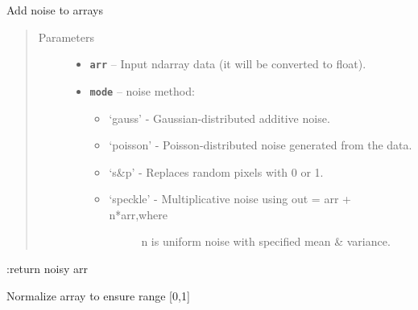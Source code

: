 \documentclass[letterpaper,10pt,english]{sphinxmanual}
\begin{document}
\begin{fulllineitems}
\label{RRtoolbox.lib.arrayops:RRtoolbox.lib.arrayops.basic.noisy}
Add noise to arrays
\begin{quote}\begin{description}
\item[{Parameters}] \leavevmode\begin{itemize}
\item {} 
\textbf{\texttt{arr}} -- Input ndarray data (it will be converted to float).

\item {} 
\textbf{\texttt{mode}} -- 
noise method:
\begin{itemize}
\item {} 
`gauss' - Gaussian-distributed additive noise.

\item {} 
`poisson' - Poisson-distributed noise generated from the data.

\item {} 
`s\&p' - Replaces random pixels with 0 or 1.

\item {} \begin{description}
\item[{`speckle' - Multiplicative noise using out = arr + n*arr,where}] \leavevmode
n is uniform noise with specified mean \& variance.

\end{description}

\end{itemize}


\end{itemize}

\end{description}\end{quote}

:return noisy arr

\end{fulllineitems}


\begin{fulllineitems}
\label{RRtoolbox.lib.arrayops:RRtoolbox.lib.arrayops.basic.normalize}
Normalize array to ensure range {[}0,1{]}

\end{fulllineitems}
\end{document}
